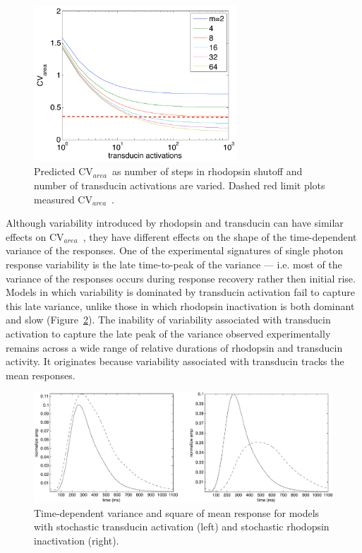 \documentclass[12pt]{article}
\def\CVArea{CV$_{area}$~}
\begin{document}
\begin{figure}[h]
\begin{center}
\includegraphics[width=3in]{theory-limits.pdf}
\caption{Predicted \CVArea as number of steps in rhodopsin shutoff and number of transducin activations are varied.  Dashed red limit plots measured \CVArea.}  
\label{fig:theory-limits}
\end{center}
\end{figure}

Although variability introduced by rhodopsin and transducin can have similar effects on \CVArea, they have different effects on the shape of the time-dependent variance of the responses.  One of the experimental signatures of single photon response variability is the late time-to-peak of the variance --- i.e. most of the variance of the responses occurs during response recovery rather then initial rise.  Models in which variability is dominated by transducin activation fail to capture this late variance, unlike those in which rhodopsin inactivation is both dominant and slow (Figure~\ref{fig:TvsRh}).  The inability of variability associated with transducin activation to capture the late peak of the variance observed experimentally remains across a wide range of relative durations of rhodopsin and transducin activity.  It originates because variability associated with transducin tracks the mean responses.  

\begin{figure}[h]
\begin{center}
\includegraphics[width=5in]{TvsRh.pdf}
\caption{Time-dependent variance and square of mean response for models with stochastic transducin activation (left) and stochastic rhodopsin inactivation (right).}  
\label{fig:TvsRh}
\end{center}
\end{figure}
\end{document}
